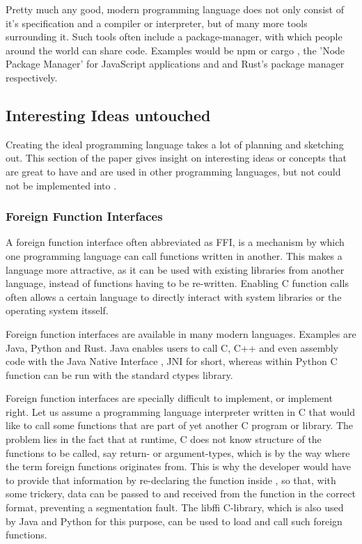 \documentclass[12pt,a4paper]{article}
\newcommand{\cte}[1] {
    \cite{#1}
}
\begin{document}
Pretty much any good, modern programming language does not only consist
of it's specification and a compiler or interpreter, but of many more
tools surrounding it.
Such tools often include a package-manager, with which people around the world
can share code. Examples would be npm\cte{npm} or cargo\cte{cargo}, 
the 'Node Package Manager' for JavaScript applications and and Rust's package 
manager respectively.

\subsection{Interesting Ideas untouched}
Creating the ideal programming language takes a lot of planning and sketching
out. This section of the paper gives insight on interesting ideas or concepts
that are great to have and are used in other programming languages, but not 
could not be implemented into \name.

\subsubsection{Foreign Function Interfaces}
A foreign function interface\cte{FFI} often abbreviated as FFI,
is a mechanism by which one programming language can call functions written 
in another. This makes a language more attractive, as it can be used with
existing libraries from another language, instead of functions having to be
re-written. Enabling C function calls often allows a certain language to
directly interact with system libraries or the operating system itsself.

Foreign function interfaces are available in many modern languages.
Examples are Java, Python and Rust.
Java enables users to call C, C++ and even assembly code with the Java Native
Interface\cte{JNI}, JNI for short, whereas within Python C function can
be run with the standard ctypes\cte{ctypes} library.

Foreign function interfaces are specially difficult to implement, or implement
right. Let us assume a programming language interpreter \name written in C that
would like to call some functions that are part of yet another C program or
library. The problem lies in the fact that at runtime, C does not know
structure of the functions to be called, say return- or argument-types, which
is by the way where the term foreign functions originates from. This is why the
\name developer would have to provide that information by re-declaring the
function inside \name, so that, with some trickery, data can be passed to and
received from the function in the correct format, preventing a segmentation
fault. The libffi\cte{libffi} C-library, which is also used by Java and
Python for this purpose, can be used to load and call such foreign functions.
\end{document}

